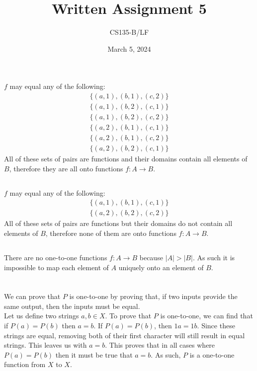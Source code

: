 \documentclass{article}
\title{Written Assignment 5}
\author{CS135-B/LF}
\date{March 5, 2024}
\begin{document}
\maketitle
\raggedright

\section{}
\subsection{}
$f$ may equal any of the following:
\begin{gather*}
    \{ (a, 1), (b, 1), (c, 2) \} \\
    \{ (a, 1), (b, 2), (c, 1) \} \\
    \{ (a, 1), (b, 2), (c, 2) \} \\
    \{ (a, 2), (b, 1), (c, 1) \} \\
    \{ (a, 2), (b, 1), (c, 2) \} \\
    \{ (a, 2), (b, 2), (c, 1) \}
\end{gather*}
All of these sets of pairs are functions and their domains contain all elements 
of $B$, therefore they are all onto functions $f: A \rightarrow B$.

\subsection{}
$f$ may equal any of the following:
\begin{gather*}
    \{ (a, 1), (b, 1), (c, 1) \} \\
    \{ (a, 2), (b, 2), (c, 2) \}
\end{gather*}
All of these sets of pairs are functions but their domains do not contain all 
elements of $B$, therefore none of them are onto functions $f: A \rightarrow B$.

\subsection{}
There are no one-to-one functions $f: A \rightarrow B$ because $|A| > |B|$. As such
it is impossible to map each element of $A$ uniquely onto an element of $B$.

\section{}
\subsection{}
We can prove that $P$ is one-to-one by proving that, if two inputs provide the same output, then the inputs must be equal.\\
Let us define two strings $a, b \in X$. To prove that $P$ is one-to-one, we can find that if $P(a) = P(b)$ then $a = b$. 
If $P(a) = P(b)$, then $1a = 1b$.
Since these strings are equal, removing both of their first character will still result in equal strings. This leaves us with $a = b$. 
This proves that in all cases where $P(a) = P(b)$ then it must be true that $a = b$. As such, $P$ is a one-to-one function from $X$ to $X$.
\end{document}
